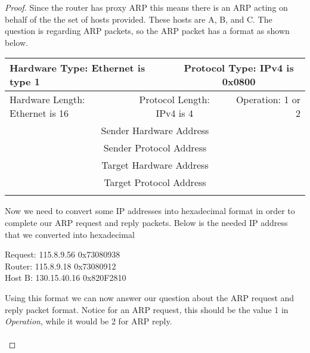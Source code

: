 \documentclass[12pt]{article}
\begin{document}
\begin{proof}
Since the router has proxy ARP this means there is an ARP acting on behalf of the the set of hosts provided. These hosts are A, B, and C. The question is regarding ARP packets, so the ARP packet has a format as shown below. 

\bigskip
\begin{center}
\begin{tabular}{c c c c c c }
     \hline
    \multicolumn{3}{|l}{Hardware Type: Ethernet is type 1} & \multicolumn{3}{|c|}{Protocol Type: IPv4 is 0x0800} \\
    \hline
    \multicolumn{2}{|l}{Hardware Length: Ethernet is 16} & \multicolumn{2}{|c|}{Protocol Length: IPv4 is 4}  & \multicolumn{2}{r|}{Operation: 1 or 2} \\
     \hline
     \multicolumn{6}{|c|}{Sender Hardware Address} \\
     \hline 
     \multicolumn{6}{|c|}{Sender Protocol Address} \\ 
     \hline 
     \multicolumn{6}{|c|}{Target Hardware Address} \\
     \hline 
    \multicolumn{6}{|c|}{Target Protocol Address} \\
    \hline
    \\
\end{tabular}
\end{center}

Now we need to convert some IP addresses into hexadecimal format in order to complete our ARP request and reply packets. Below is the needed IP address that we converted into hexadecimal 

\begin{center}
Request: 115.8.9.56 \longrightarrow 0x73080938 \\
Router: 115.8.9.18 \longrightarrow 0x73080912 \\
Host B: 130.15.40.16 \longrightarrow 0x820F2810 \\ 
\end{center}

Using this format we can now answer our question about the ARP request and reply packet format. Notice for an ARP request, this should be the value 1 in \textit{Operation}, while it would be 2 for ARP reply. \\ \\ 



\end{proof}
\end{document}
